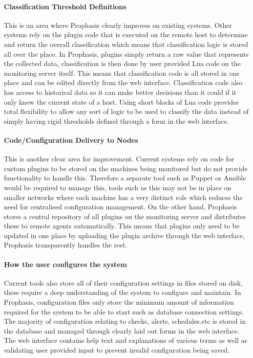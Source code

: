 \documentclass[bsc,logo,twoside,singlespacing,notimes]{infthesis}
\begin{document}
\paragraph*{Classification Threshold Definitions}
	This is an area where Prophasis clearly improves on existing systems.  Other
	systems rely on the plugin code that is executed on the remote host to
	determine and return the overall classification which means that classification
	logic is stored all over the place.  In Prophasis, plugins simply return a raw
	value that represents the collected data, classification is then done by user
	provided Lua code on the monitoring server itself.  This means that
	classification code is all stored in one place and can be edited directly from
	the web interface.  Classification code also has access to historical data so
	it can make better decisions than it could if it only knew the current state of
	a host.  Using short blocks of Lua code provides total flexibility to allow any
	sort of logic to be used to classify the data instead of simply having
	rigid thresholds defined through a form in the web interface.

\paragraph*{Code/Configuration Delivery to Nodes} %
	This is another clear area for improvement.  Current systems rely on code for 
	custom plugins to be stored on the machines being monitored but do not provide
	functionality to handle this.  Therefore a separate tool such as Puppet or
	Ansible would be required to manage this, tools such as this may not be in
	place on smaller networks where each machine has a very distinct role which
	reduces the need for centralised configuration management.  On the other hand,
	Prophasis stores a central repository of all plugins on the monitoring server
	and distributes these to remote agents automatically.  This means that plugins
	only need to be updated in one place by uploading the plugin archive through
	the web interface, Prophasis transparently handles the rest.

\paragraph*{How the user configures the system}
	Current tools also store all of their configuration settings in files stored on
	disk, these require a deep understanding of the system to configure and
	maintain. In Prophasis, configuration files only store the minimum amount of
	information required for the system to be able to start such as database
	connection settings.  The majority of configuration relating to checks, alerts,
	schedules.etc is stored in the database and managed through clearly laid out
	forms in the web interface.  The web interface contains help text and
	explanations of various terms as well as validating user provided input to
	prevent invalid configuration being saved.
\end{document}
